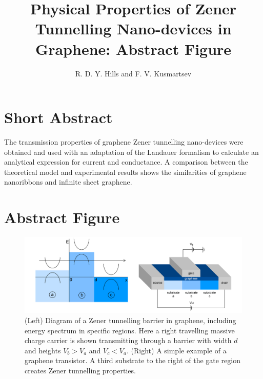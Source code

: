 \documentclass[12pt,a4paper]{article}
\title{Physical Properties of Zener Tunnelling Nano-devices in Graphene: Abstract Figure}
\author{R. D. Y. Hills and F. V. Kusmartsev}
\begin{document}
\maketitle
\section{Short Abstract}
	The transmission properties of graphene Zener tunnelling nano-devices were obtained and used with an adaptation of the Landauer formalism to calculate an analytical expression for current and conductance. A comparison between the theoretical model and experimental results shows the similarities of graphene nanoribbons and infinite sheet graphene.
\section{Abstract Figure}
	\begin{figure}[h]
		\centerline{\includegraphics[scale=0.25]{image-abstract-flat}}
		\caption{(Left) Diagram of a Zener tunnelling barrier in graphene, including energy spectrum in specific regions. Here a right travelling massive charge carrier is shown transmitting through a barrier with width $d$ and heights $V_{b}>V_{a}$ and $V_{c}<V_{a}$. (Right) A simple example of a graphene transistor. A third substrate to the right of the gate region creates Zener tunnelling properties.}
		\label{}
	\end{figure}
\end{document}
